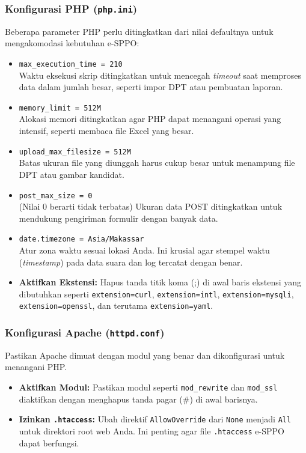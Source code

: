 \subsubsection{Konfigurasi PHP (\texttt{php.ini})}
Beberapa parameter PHP perlu ditingkatkan dari nilai defaultnya untuk mengakomodasi kebutuhan e-SPPO:
\begin{itemize}
	\item \texttt{max\_execution\_time = 210} \\ Waktu eksekusi skrip ditingkatkan untuk mencegah \textit{timeout} saat memproses data dalam jumlah besar, seperti impor DPT atau pembuatan laporan.
	\item \texttt{memory\_limit = 512M} \\ Alokasi memori ditingkatkan agar PHP dapat menangani operasi yang intensif, seperti membaca file Excel yang besar.
	\item \texttt{upload\_max\_filesize = 512M} \\ Batas ukuran file yang diunggah harus cukup besar untuk menampung file DPT atau gambar kandidat.
	\item \texttt{post\_max\_size = 0} \\ (Nilai 0 berarti tidak terbatas) Ukuran data POST ditingkatkan untuk mendukung pengiriman formulir dengan banyak data.
	\item \texttt{date.timezone = Asia/Makassar} \\ Atur zona waktu sesuai lokasi Anda. Ini krusial agar stempel waktu (\textit{timestamp}) pada data suara dan log tercatat dengan benar.
	\item \textbf{Aktifkan Ekstensi:} Hapus tanda titik koma (;) di awal baris ekstensi yang dibutuhkan seperti \texttt{extension=curl}, \texttt{extension=intl}, \texttt{extension=mysqli}, \texttt{extension=openssl}, dan terutama \texttt{extension=yaml}.
\end{itemize}

\subsubsection{Konfigurasi Apache (\texttt{httpd.conf})}
Pastikan Apache dimuat dengan modul yang benar dan dikonfigurasi untuk menangani PHP.
\begin{itemize}
	\item \textbf{Aktifkan Modul:} Pastikan modul seperti \texttt{mod\_rewrite} dan \texttt{mod\_ssl} diaktifkan dengan menghapus tanda pagar (\#) di awal barisnya.
	\item \textbf{Izinkan \texttt{.htaccess}:} Ubah direktif \texttt{AllowOverride} dari \texttt{None} menjadi \texttt{All} untuk direktori root web Anda. Ini penting agar file \texttt{.htaccess} e-SPPO dapat berfungsi.
\end{itemize}

